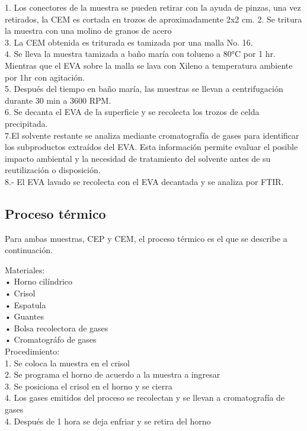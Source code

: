 1. Los conectores de la muestra se pueden retirar con la ayuda de pinzas, una vez retirados, la CEM es cortada en trozos de aproximadamente 2x2 cm.
2. Se tritura la muestra con una molino de granos de acero\\
3. La CEM obtenida es triturada es tamizada por una malla No. 16.\\
4. Se lleva la muestra tamizada a baño maría con tolueno a 80°C por 1 hr. Mientras que el EVA sobre la malla se lava con Xileno a temperatura ambiente por 1hr con agitación.\\
5. Después del tiempo en baño maría, las muestras se llevan a centrifugación durante 30 min a 3600 RPM.\\
6. Se decanta el EVA de la superficie y se recolecta los trozos de celda precipitada.\\
7.El solvente restante se analiza mediante cromatografía de gases para identificar los subproductos extraídos del EVA. Esta información permite evaluar el posible impacto ambiental y la necesidad de tratamiento del solvente antes de su reutilización o disposición.\\
8.- El EVA lavado se recolecta con el EVA decantada y se analiza por FTIR.


\subsection{Proceso térmico}
\label{sec:proceso térmico}

Para ambas muestras, CEP y CEM, el proceso térmico es el que se describe a continuación.

Materiales:\\ 
• Horno cilíndrico\\ 
• Crisol\\ 
• Espatula\\ 
• Guantes\\ 
• Bolsa recolectora de gases\\
• Cromatográfo de gases\\


Procedimiento:\\ 
1.	Se coloca la muestra en el crisol\\
2.  Se programa el horno de acuerdo a la muestra a ingresar \\
3.  Se posiciona el crisol en el horno y se cierra\\
4.  Los gases emitidos del proceso se recolectan y se llevan a cromatografía de gases\\
4.  Después de 1 hora se deja enfriar y se retira del horno 

